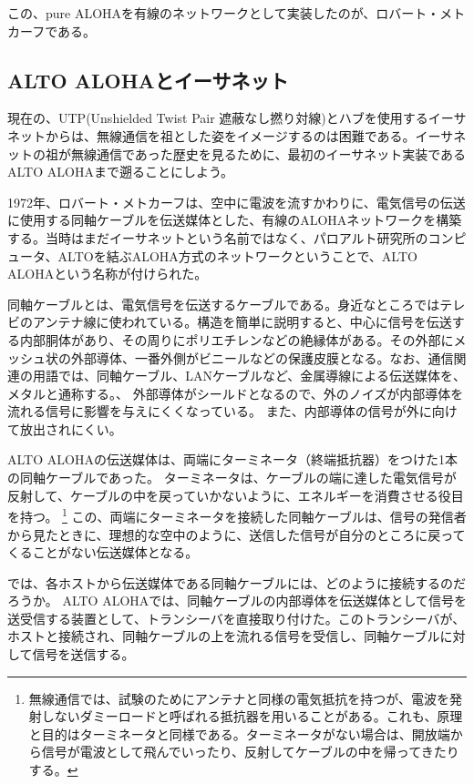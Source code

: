 この、pure ALOHAを有線のネットワークとして実装したのが、ロバート・メトカーフである。

\subsection{ALTO ALOHAとイーサネット}

現在の、UTP(Unshielded Twist Pair 遮蔽なし撚り対線)とハブを使用するイーサネットからは、無線通信を祖とした姿をイメージするのは困難である。イーサネットの祖が無線通信であった歴史を見るために、最初のイーサネット実装であるALTO ALOHAまで遡ることにしよう。

1972年、ロバート・メトカーフは、空中に電波を流すかわりに、電気信号の伝送に使用する同軸ケーブルを伝送媒体とした、有線のALOHAネットワークを構築する。当時はまだイーサネットという名前ではなく、パロアルト研究所のコンピュータ、ALTOを結ぶALOHA方式のネットワークということで、ALTO ALOHAという名称が付けられた。

同軸ケーブルとは、電気信号を伝送するケーブルである。身近なところではテレビのアンテナ線に使われている。構造を簡単に説明すると、中心に信号を伝送する内部胴体があり、その周りにポリエチレンなどの絶縁体がある。その外部にメッシュ状の外部導体、一番外側がビニールなどの保護皮膜となる。なお、通信関連の用語では、同軸ケーブル、LANケーブルなど、金属導線による伝送媒体を、メタルと通称する。、
外部導体がシールドとなるので、外のノイズが内部導体を流れる信号に影響を与えにくくなっている。
また、内部導体の信号が外に向けて放出されにくい。

ALTO ALOHAの伝送媒体は、両端にターミネータ（終端抵抗器）をつけた1本の同軸ケーブルであった。
ターミネータは、ケーブルの端に達した電気信号が反射して、ケーブルの中を戻っていかないように、エネルギーを消費させる役目を持つ。
\footnote{無線通信では、試験のためにアンテナと同様の電気抵抗を持つが、電波を発射しないダミーロードと呼ばれる抵抗器を用いることがある。これも、原理と目的はターミネータと同様である。ターミネータがない場合は、開放端から信号が電波として飛んでいったり、反射してケーブルの中を帰ってきたりする。}
この、両端にターミネータを接続した同軸ケーブルは、信号の発信者から見たときに、理想的な空中のように、送信した信号が自分のところに戻ってくることがない伝送媒体となる。

では、各ホストから伝送媒体である同軸ケーブルには、どのように接続するのだろうか。
ALTO ALOHAでは、同軸ケーブルの内部導体を伝送媒体として信号を送受信する装置として、トランシーバを直接取り付けた。このトランシーバが、ホストと接続され、同軸ケーブルの上を流れる信号を受信し、同軸ケーブルに対して信号を送信する。

